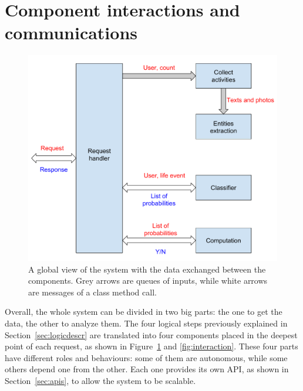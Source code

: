 \section{Component interactions and communications}
\label{sec:view}
\begin{figure}
\centering
\includegraphics[width=%
1.0\textwidth]{img/Globalview}
\caption{A global view of the system with the data exchanged between the components. Grey arrows are queues of inputs, while white arrows are messages of a class method call.}
\label{fig:globalview}
\end{figure}

Overall, the whole system can be divided in two big parts: the one to get the data, the other to analyze them. The four logical steps previously explained in Section~\ref{sec:logicdescr} are translated into four components placed in the deepest point of each request, as shown in Figure~\ref{fig:globalview} and \ref{fig:interaction}. These four parts have different roles and behaviours: some of them are autonomous, while some others depend one from the other. Each one provides its own API, as shown in Section~\ref{sec:apis}, to allow the system to be scalable.

